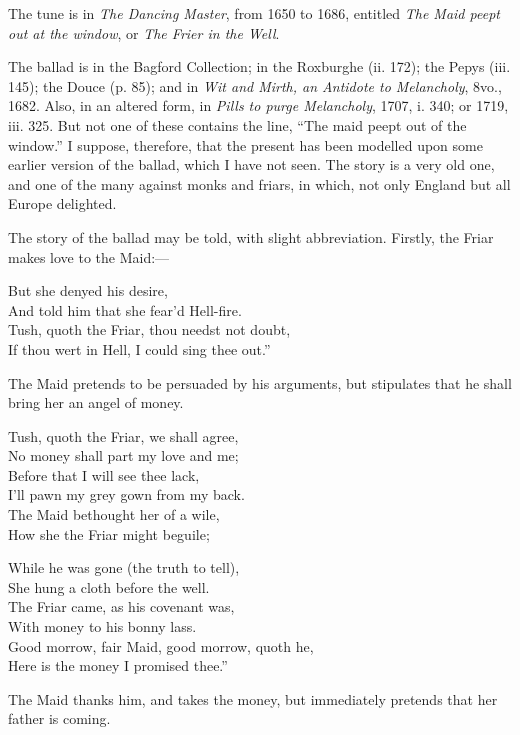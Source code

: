 The tune is in \textit{The Dancing Master}, from 1650 to 1686, entitled \textit{The Maid
peept out at the window}, or \textit{The Frier in the Well}.

The ballad is in the Bagford Collection; in the Roxburghe (ii. 172); the
Pepys (iii. 145); the Douce (p. 85); and in \textit{Wit and Mirth, an Antidote to
Melancholy}, 8vo., 1682. Also, in an altered form, in\textit{ Pills to purge Melancholy},
1707, i. 340; or 1719, iii. 325. But not one of these contains the line, “The
maid peept out of the window.” I suppose, therefore, that the present has been
modelled upon some earlier version of the ballad, which I have not seen. The
story is a very old one, and one of the many against monks and friars, in which,
not only England but all Europe delighted.




The story of the ballad may be told, with slight abbreviation. Firstly, the
Friar makes love to the Maid:---
\settowidth{\versewidth}{Tush, quoth the Friar, thou needst not doubt,}
\begin{scverse}
But she denyed his desire,\\
And told him that she fear’d Hell-fire.\\
Tush, quoth the Friar, thou needst not doubt,\\
If thou wert in Hell, I could sing thee out.”
\end{scverse}
\pagebreak

The Maid pretends to be persuaded by his arguments, but stipulates that he shall
bring her an angel of money.

\begin{dcverse}\settowidth{\versewidth}{How she the Friar might beguile;}
Tush, quoth the Friar, we shall agree,\\
No money shall part my love and me;\\
Before that I will see thee lack,\\
I’ll pawn my grey gown from my back.\\
The Maid bethought her of a wile,\\
How she the Friar might beguile;

While he was gone (the truth to tell),\\
She hung a cloth before the well.\\
The Friar came, as his covenant was,\\
With money to his bonny lass.\\
Good morrow, fair Maid, good morrow, quoth he,\\
Here is the money I promised thee.”
\end{dcverse}
The Maid thanks him, and takes the money, but immediately pretends that her
father is coming.

